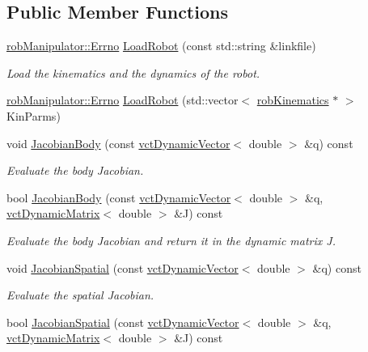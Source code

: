 \subsection*{Public Member Functions}
\begin{DoxyCompactItemize}
\item 
\hyperlink{classrob_manipulator_a7bbb51cdb81c9c681075a9274ca0cdc0}{rob\+Manipulator\+::\+Errno} \hyperlink{classrob_manipulator_afeb544ece26328d3dc013e105b0acdcf}{Load\+Robot} (const std\+::string \&linkfile)
\begin{DoxyCompactList}\small\item\em Load the kinematics and the dynamics of the robot. \end{DoxyCompactList}\item 
\hyperlink{classrob_manipulator_a7bbb51cdb81c9c681075a9274ca0cdc0}{rob\+Manipulator\+::\+Errno} \hyperlink{classrob_manipulator_a6eb3b10e9e5d5f56976bb9da7967efca}{Load\+Robot} (std\+::vector$<$ \hyperlink{classrob_kinematics}{rob\+Kinematics} $\ast$ $>$ Kin\+Parms)
\item 
void \hyperlink{classrob_manipulator_a6b998ea891870822b93d622aa837ecd3}{Jacobian\+Body} (const \hyperlink{classvct_dynamic_vector}{vct\+Dynamic\+Vector}$<$ double $>$ \&q) const 
\begin{DoxyCompactList}\small\item\em Evaluate the body Jacobian. \end{DoxyCompactList}\item 
bool \hyperlink{classrob_manipulator_a00497a527bc3ca87583f7edf6b59986c}{Jacobian\+Body} (const \hyperlink{classvct_dynamic_vector}{vct\+Dynamic\+Vector}$<$ double $>$ \&q, \hyperlink{classvct_dynamic_matrix}{vct\+Dynamic\+Matrix}$<$ double $>$ \&J) const 
\begin{DoxyCompactList}\small\item\em Evaluate the body Jacobian and return it in the dynamic matrix J. \end{DoxyCompactList}\item 
void \hyperlink{classrob_manipulator_a4ba11995ed4b30a2a0d5042281810bc9}{Jacobian\+Spatial} (const \hyperlink{classvct_dynamic_vector}{vct\+Dynamic\+Vector}$<$ double $>$ \&q) const 
\begin{DoxyCompactList}\small\item\em Evaluate the spatial Jacobian. \end{DoxyCompactList}\item 
bool \hyperlink{classrob_manipulator_a8817bbf6ca1921700165b29232aee8ad}{Jacobian\+Spatial} (const \hyperlink{classvct_dynamic_vector}{vct\+Dynamic\+Vector}$<$ double $>$ \&q, \hyperlink{classvct_dynamic_matrix}{vct\+Dynamic\+Matrix}$<$ double $>$ \&J) const 

\end{DoxyCompactItemize}
